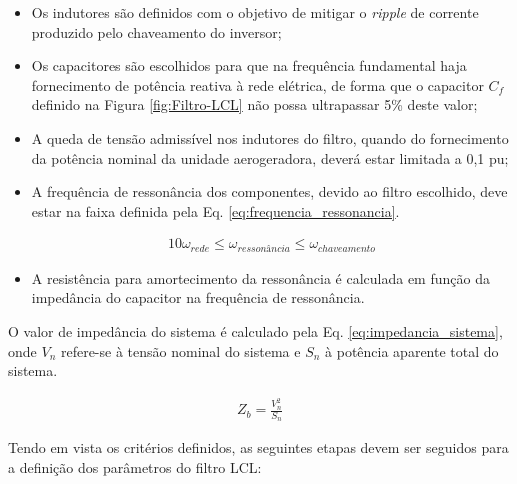 \begin{itemize}
	\item Os indutores são definidos com o objetivo de mitigar o \textit{ripple} de corrente produzido pelo chaveamento do inversor;
	\item Os capacitores são escolhidos para que na frequência fundamental haja fornecimento de potência reativa à rede elétrica, de forma que o capacitor $C_f$ definido na Figura \ref{fig:Filtro-LCL} não possa ultrapassar 5\% deste valor;
	\item A queda de tensão admissível nos indutores do filtro, quando do fornecimento da potência nominal da unidade aerogeradora, deverá estar limitada a 0,1 pu;
	\item A frequência de ressonância dos componentes, devido ao filtro escolhido, deve estar na faixa definida pela Eq. \ref{eq:frequencia_ressonancia}.
	
\begin{align}\label{eq:frequencia_ressonancia}
10 \omega_{rede} \leq \omega_{ressonância} \leq \omega_{chaveamento}
\end{align}
	\item A resistência para amortecimento da ressonância é calculada em função da impedância do capacitor na frequência de ressonância.
\end{itemize}
	

O valor de impedância do sistema é calculado pela Eq. \ref{eq:impedancia_sistema}, onde $V_n$ refere-se à tensão nominal do sistema e $S_n$ à potência aparente total do sistema.

\begin{align}\label{eq:impedancia_sistema}
	Z_b = \frac{V_n^2}{S_n}
\end{align}

Tendo em vista os critérios definidos, as seguintes etapas devem ser seguidos para a definição dos parâmetros do filtro LCL:


